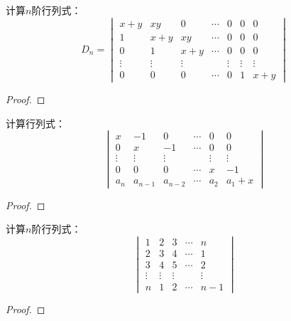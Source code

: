 \setcounter{problem}{8}
\begin{problem}
计算\(n\)阶行列式：
\begin{equation*}
    D_n=
    \begin{vmatrix}
        x+y    & xy     & 0      & \cdots & 0      & 0      & 0      \\
        1      & x+y    & xy     & \cdots & 0      & 0      & 0      \\
        0      & 1      & x+y    & \cdots & 0      & 0      & 0      \\
        \vdots & \vdots & \vdots &        & \vdots & \vdots & \vdots \\
        0      & 0      & 0      & \cdots & 0      & 1      & x+y
    \end{vmatrix}
\end{equation*}
\end{problem}
\begin{proof}

\end{proof}

\setcounter{problem}{11}
\begin{problem}
计算行列式：
\begin{equation*}
    \begin{vmatrix}
        x      & -1      & 0       & \cdots & 0      & 0      \\
        0      & x       & -1      & \cdots & 0      & 0      \\
        \vdots & \vdots  & \vdots  &        & \vdots & \vdots \\
        0      & 0       & 0       & \cdots & x      & -1     \\
        a_n    & a_{n-1} & a_{n-2} & \cdots & a_2    & a_1+x
    \end{vmatrix}
\end{equation*}
\end{problem}
\begin{proof}

\end{proof}

\begin{problem}
计算\(n\)阶行列式：
\begin{equation*}
    \begin{vmatrix}
        1      & 2      & 3      & \cdots & n      \\
        2      & 3      & 4      & \cdots & 1      \\
        3      & 4      & 5      & \cdots & 2      \\
        \vdots & \vdots & \vdots &        & \vdots \\
        n      & 1      & 2      & \cdots & n-1
    \end{vmatrix}
\end{equation*}
\end{problem}
\begin{proof}

\end{proof}

